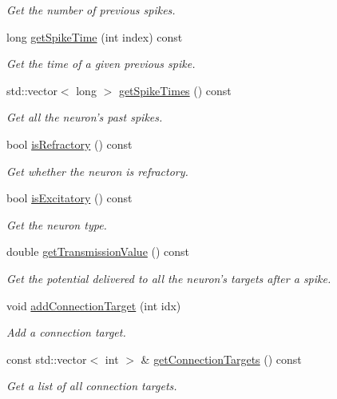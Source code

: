 \begin{DoxyCompactItemize}
\begin{DoxyCompactList}\small\item\em Get the number of previous spikes. \end{DoxyCompactList}\item 
long \hyperlink{classNeuron_a3e384609e8e1e73202abdd10ec79ef2e}{get\-Spike\-Time} (int index) const 
\begin{DoxyCompactList}\small\item\em Get the time of a given previous spike. \end{DoxyCompactList}\item 
std\-::vector$<$ long $>$ \hyperlink{classNeuron_af0e376951d666bfd4c860b25863d28b4}{get\-Spike\-Times} () const 
\begin{DoxyCompactList}\small\item\em Get all the neuron's past spikes. \end{DoxyCompactList}\item 
bool \hyperlink{classNeuron_aa40fbb2b025efb1db420da32e16741c1}{is\-Refractory} () const 
\begin{DoxyCompactList}\small\item\em Get whether the neuron is refractory. \end{DoxyCompactList}\item 
bool \hyperlink{classNeuron_a65f5868f9a2ddc2414a5880f28b76d4c}{is\-Excitatory} () const 
\begin{DoxyCompactList}\small\item\em Get the neuron type. \end{DoxyCompactList}\item 
double \hyperlink{classNeuron_a177c8f1881dd4ae47e505d8040e990c8}{get\-Transmission\-Value} () const 
\begin{DoxyCompactList}\small\item\em Get the potential delivered to all the neuron's targets after a spike. \end{DoxyCompactList}\item 
void \hyperlink{classNeuron_a359701815e8c72b460d2959a339c4b54}{add\-Connection\-Target} (int idx)
\begin{DoxyCompactList}\small\item\em Add a connection target. \end{DoxyCompactList}\item 
const std\-::vector$<$ int $>$ \& \hyperlink{classNeuron_ac2730f0eb7d821f2d49d4ab017f5a6d9}{get\-Connection\-Targets} () const 
\begin{DoxyCompactList}\small\item\em Get a list of all connection targets. \end{DoxyCompactList}\item 

\end{DoxyCompactItemize}
